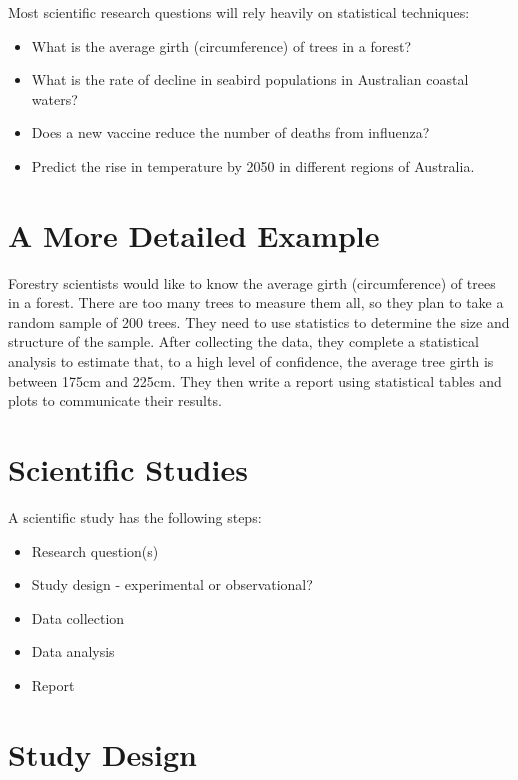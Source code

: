 \documentclass[
]{book}
\providecommand{\tightlist}{%
  \setlength{\itemsep}{0pt}\setlength{\parskip}{0pt}}
\begin{document}
Most scientific research questions will rely heavily on statistical techniques:

\begin{itemize}
\tightlist
\item
  What is the average girth (circumference) of trees in a forest?
\item
  What is the rate of decline in seabird populations in Australian coastal waters?
\item
  Does a new vaccine reduce the number of deaths from influenza?
\item
  Predict the rise in temperature by 2050 in different regions of Australia.
\end{itemize}

\section{A More Detailed Example}\label{a-more-detailed-example}

Forestry scientists would like to know the average girth (circumference) of trees in a forest. There are too many trees to measure them all, so they plan to take a random sample of 200 trees. They need to use statistics to determine the size and structure of the sample. After collecting the data, they complete a statistical analysis to estimate that, to a high level of confidence, the average tree girth is between 175cm and 225cm. They then write a report using statistical tables and plots to communicate their results.

\section{Scientific Studies}\label{scientific-studies}

A scientific study has the following steps:

\begin{itemize}
\tightlist
\item
  Research question(s)
\item
  Study design - experimental or observational?
\item
  Data collection
\item
  Data analysis
\item
  Report
\end{itemize}

\section{Study Design}\label{study-design}
\end{document}
